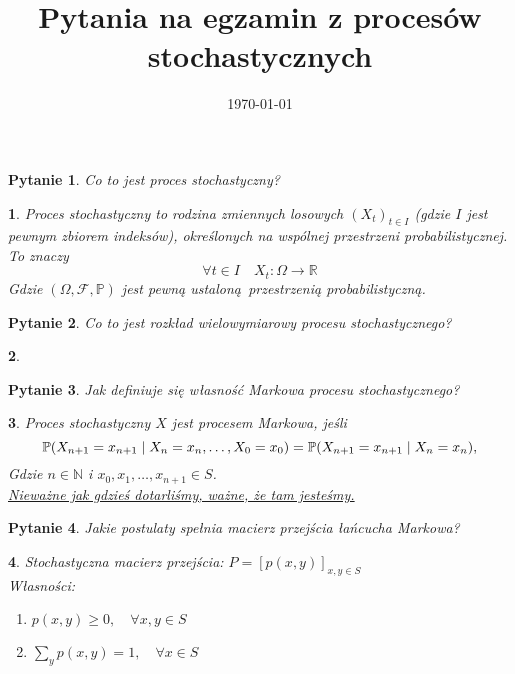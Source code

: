 \documentclass[10pt]{mwart}
\title{Pytania na egzamin z procesów stochastycznych}
\date{\today}
\theoremstyle{plain}
\newtheorem{pytanie}{Pytanie}
\theoremstyle{break}
\newtheorem*{odpowiedź}{}
\begin{document}

\begin{pytanie}
Co to jest proces stochastyczny?
\end{pytanie}
\begin{odpowiedź}
    Proces stochastyczny to rodzina zmiennych losowych $(X_t)_{t\in I}$
    (gdzie $I$ jest pewnym zbiorem indeksów), określonych na wspólnej
    przestrzeni probabilistycznej. To znaczy \[
    \forall t \in I \quad X_t : \Omega \to \mathbb{R}
    \]
    Gdzie $(\Omega, \mathcal{F}, \mathbb{P})$ jest pewną ustaloną przestrzenią
    probabilistyczną.
\end{odpowiedź}


\begin{pytanie}
Co to jest rozkład wielowymiarowy procesu stochastycznego?
\end{pytanie}
\begin{odpowiedź}
\end{odpowiedź}


\begin{pytanie}
Jak definiuje się własność Markowa procesu stochastycznego?
\end{pytanie}
\begin{odpowiedź}
    Proces stochastyczny $X$ jest procesem Markowa, jeśli \[
    \mathbb{P}(X_{n+1}=x_{n+1}\mid X_n=x_n,\ldots ,X_0=x_0)\\
    = \mathbb{P}(X_{n+1}=x_{n+1}\mid X_n=x_n),
    \]
    Gdzie $n \in \mathbb{N}$ i $x_0, x_1, \ldots, x_{n+1} \in S$.\\
    \underline{Nieważne jak gdzieś dotarliśmy, ważne, że tam jesteśmy.}
\end{odpowiedź}


\begin{pytanie}
Jakie postulaty spełnia macierz przejścia łańcucha Markowa?
\end{pytanie}
\begin{odpowiedź}
    Stochastyczna macierz przejścia: $P = [p(x,y)]_{x, y\in S}$\\
    Własności:
    \begin{enumerate}
        \item $p(x, y) \geq 0, \quad \forall x, y \in S$
        \item $\sum_{y} p(x, y) = 1, \quad \forall x \in S$
    \end{enumerate}
\end{odpowiedź}
\end{document}
